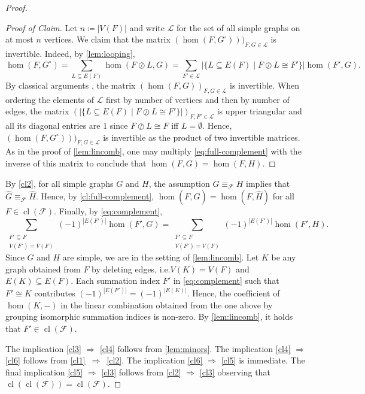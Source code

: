 \documentclass[3p,final]{elsarticle}
\DeclareMathOperator{\cl}{cl}
\newenvironment{claimproof}[1][Proof of Claim]{\begin{proof}[#1] \renewcommand{\qedsymbol}{$\lrcorner$}}{ \end{proof}}
\begin{document}
\begin{proof}
\begin{claimproof}
			Let $n \coloneqq |V(F)|$ and write $\mathcal{L}$ for the set of all simple graphs on at most $n$ vertices. We claim that the matrix $(\hom(F, G^\circ)))_{F, G \in \mathcal{L}}$ is invertible. Indeed, by \cref{lem:looping},
			\[
			\hom(F, G^\circ) = \sum_{L \subseteq E(F)} \hom(F \oslash L, G)
			= \sum_{F' \in \mathcal{L}} |\{L \subseteq E(F) \mid F \oslash L \cong F'\}| \hom(F', G).
			\]
			By classical arguments \cite{lovasz_operations_1967}, the matrix $(\hom(F, G))_{F, G \in \mathcal{L}}$ is invertible. When ordering the elements of $\mathcal{L}$ first by number of vertices and then by number of edges, the matrix $(|\{L \subseteq E(F) \mid F \oslash L \cong F'\}|)_{F, F' \in \mathcal{L}}$ is upper triangular and all its diagonal entries are $1$ since $F \oslash L \cong F$ iff $L = \emptyset$. Hence, $(\hom(F, G^\circ)))_{F, G \in \mathcal{L}}$ is invertible as the product of two invertible matrices.
			As in the proof of \cref{lem:lincomb},
			one may multiply \cref{eq:full-complement} with the inverse of this matrix to conclude that $\hom(F, G) = \hom(F, H)$.
		\end{claimproof}
		
		By \ref{cl2}, for all simple graphs $G$ and $H$, the assumption $G \equiv_{\mathcal{F}} H $ implies that $\widehat{G} \equiv_{\mathcal{F}} \widehat{H}$.
		Hence, by \cref{cl:full-complement}, $\hom(F, \widehat{G}) = \hom(F, \widehat{H})$  for all $F \in \cl(\mathcal{F})$.
		Finally, by \cref{eq:complement},
		\[
			\sum_{\substack{F' \subseteq F \\ V(F') = V(F)}} (-1)^{|E(F')|} \hom(F', G)
			= \sum_{\substack{F' \subseteq F \\ V(F') = V(F)}} (-1)^{|E(F')|} \hom(F', H).
		\]
			Since $G$ and $H$ are simple, we are in the setting of \cref{lem:lincomb}.
		Let $K$ be any graph obtained from $F$ by deleting edges, i.e.\@ $V(K) = V(F)$ and $E(K) \subseteq E(F)$.
		Each summation index $F'$ in \cref{eq:complement}  such that $F' \cong K$ contributes $(-1)^{|E(F')|} = (-1)^{|E(K)|}$.
		Hence, the coefficient of $\hom(K, -)$ in the linear combination obtained from the one above by grouping isomorphic summation indices is non-zero.
		By \cref{lem:lincomb}, it holds that $F' \in \cl(\mathcal{F})$.
		
		The implication \ref{cl3} $\Rightarrow$ \ref{cl4} follows from \cref{lem:minors}.
		The implication \ref{cl4} $\Rightarrow$ \ref{cl6} follows from \ref{cl1}~$\Rightarrow$~\ref{cl2}.
		The implication \ref{cl6} $\Rightarrow$ \ref{cl5} is immediate.
		The final implication \ref{cl5} $\Rightarrow$ \ref{cl3} follows from \ref{cl2} $\Rightarrow$ \ref{cl3} observing that $\cl(\cl(\mathcal{F})) = \cl(\mathcal{F})$.
	\end{proof}
\end{document}
